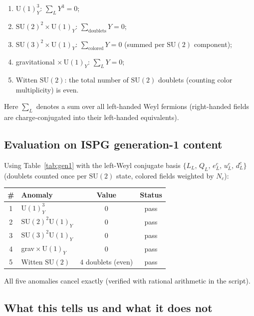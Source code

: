 \documentclass[11pt]{article}
\begin{document}
\begin{enumerate}
  \item $\mathrm{U}(1)_Y^3$: $\sum_L Y^3 = 0$;
  \item $\mathrm{SU}(2)^2\times\mathrm{U}(1)_Y$: $\sum_{\text{doublets}} Y = 0$;
  \item $\mathrm{SU}(3)^2\times\mathrm{U}(1)_Y$: $\sum_{\text{colored}} Y = 0$
    (summed per $\mathrm{SU}(2)$ component);
  \item gravitational $\times\,\mathrm{U}(1)_Y$: $\sum_L Y = 0$;
  \item Witten $\mathrm{SU}(2)$: the total number of
    $\mathrm{SU}(2)$ doublets (counting color multiplicity) is
    even.
\end{enumerate}
Here $\sum_L$ denotes a sum over all left-handed Weyl fermions
(right-handed fields are charge-conjugated into their left-handed
equivalents).

\subsection{Evaluation on ISPG generation-1 content}

Using Table~\ref{tab:gen1} with the left-Weyl conjugate basis
$\{L_L,\,Q_L,\,e_L^c,\,u_L^c,\,d_L^c\}$
(doublets counted once per $\mathrm{SU}(2)$ state, colored
fields weighted by $N_c$):

\begin{center}
\begin{tabular}{clcc}
\toprule
\# & Anomaly & Value & Status \\
\midrule
1 & $\mathrm{U}(1)_Y^3$           & $0$ & pass\\
2 & $\mathrm{SU}(2)^2\mathrm{U}(1)_Y$  & $0$ & pass\\
3 & $\mathrm{SU}(3)^2\mathrm{U}(1)_Y$  & $0$ & pass\\
4 & grav${}\times\mathrm{U}(1)_Y$ & $0$ & pass\\
5 & Witten $\mathrm{SU}(2)$       & $4$ doublets (even) & pass\\
\bottomrule
\end{tabular}
\end{center}

All five anomalies cancel exactly (verified with rational
arithmetic in the script).

\subsection{What this tells us and what it does not}
\end{document}
